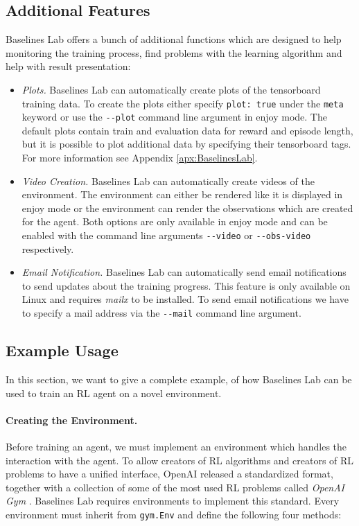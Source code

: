 \subsection{Additional Features} \label{sec:blAdvanced}
Baselines Lab offers a bunch of additional functions which are designed to help monitoring the training process, find problems with the learning algorithm and help with result presentation:

\begin{itemize}
    \item \textit{Plots.} Baselines Lab can automatically create plots of the tensorboard training data. To create the plots either specify \texttt{plot: true} under the \texttt{meta} keyword or use the \texttt{-{}-plot} command line argument in enjoy mode. The default plots contain train and evaluation data for reward and episode length, but it is possible to plot additional data by specifying their tensorboard tags. For more information see Appendix \ref{apx:BaselinesLab}.
    \item \textit{Video Creation.} Baselines Lab can automatically create videos of  the environment. The environment can either be rendered like it is displayed in enjoy mode or the environment can render the observations which are created for the agent. Both options are only available in enjoy mode and can be enabled with the command line arguments \texttt{-{}-video} or \texttt{-{}-obs-video} respectively.
    \item \textit{Email Notification.} Baselines Lab can automatically send email notifications to send updates about the training progress. This feature is only available on Linux and requires \textit{mailx} to be installed. To send email notifications we have to specify a mail address via the \texttt{-{}-mail} command line argument. 
\end{itemize}


\subsection{Example Usage} \label{sec:BLExampleUsage}
In this section, we want to give a complete example, of how Baselines Lab can be used to train an RL agent on a novel environment. 

\paragraph{Creating the Environment.} Before training an agent, we must implement an environment which handles the interaction with the agent. To allow creators of RL algorithms and creators of RL problems to have a unified interface, OpenAI released a standardized format, together with a collection of some of the most used RL problems called \textit{OpenAI Gym} \cite{openAIgym}. Baselines Lab requires environments to implement this standard. Every environment must inherit from \texttt{gym.Env} and define the following four methods:

